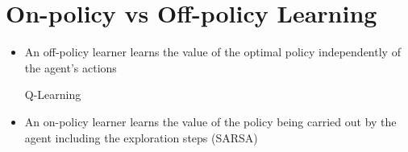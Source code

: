 \documentclass[class=article, crop=false]{standalone}
\begin{document}
\section{On-policy vs Off-policy Learning}
\begin{itemize}
    \item An off-policy learner learns the value of the optimal policy independently of the agent's actions 
    
    Q-Learning
    
    
    \item An on-policy learner learns the value of the policy being carried out by the agent including the exploration steps (SARSA)
    
\end{itemize}
\end{document}

